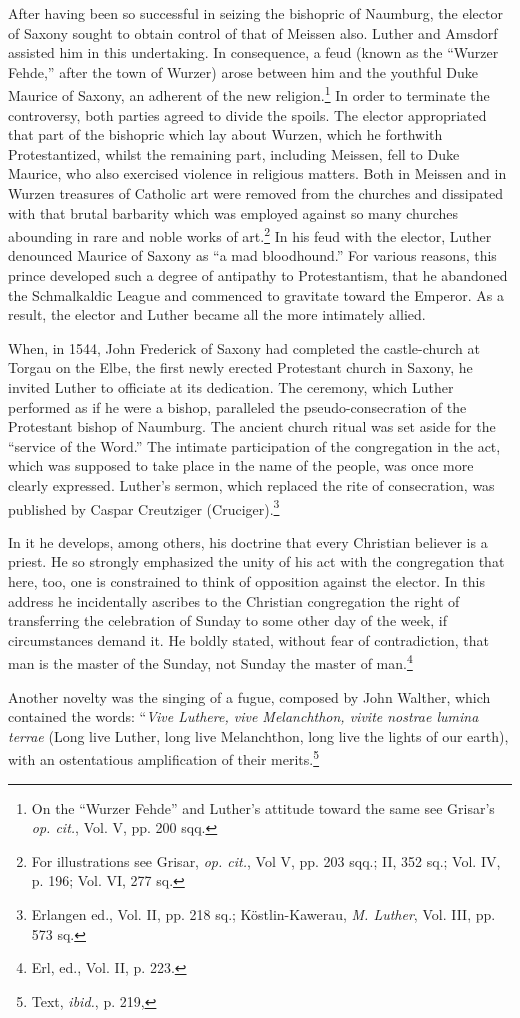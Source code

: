 After having been so successful in seizing the bishopric of Naumburg,
the elector of Saxony sought to obtain control of that of
Meissen also. Luther and Amsdorf assisted him in this undertaking.
In consequence, a feud (known as the “Wurzer Fehde,” after the
town of Wurzer) arose between him and the youthful Duke Maurice
of Saxony, an adherent of the new religion.\footnote
{On the “Wurzer Fehde” and Luther’s attitude toward the same see Grisar’s \textit{op. cit.},
Vol. V, pp. 200 sqq.}
In order to terminate
the controversy, both parties agreed to divide the spoils. The elector
appropriated that part of the bishopric which lay about Wurzen,
which he forthwith Protestantized, whilst the remaining part, including
Meissen, fell to Duke Maurice, who also exercised violence in religious
matters. Both in Meissen and in Wurzen treasures of Catholic
art were removed from the churches and dissipated with that brutal
barbarity which was employed against so many churches abounding
in rare and noble works of art.\footnote
{For illustrations see Grisar, \textit{op. cit.}, Vol V, pp. 203 sqq.; II, 352 sq.; Vol. IV, p.
196; Vol. VI, 277 sq.}
In his feud with the elector, Luther
denounced Maurice of Saxony as ``a mad bloodhound.'' For various
reasons, this prince developed such a degree of antipathy to Protestantism,
that he abandoned the Schmalkaldic League and commenced
to gravitate toward the Emperor. As a result, the elector and Luther
became all the more intimately allied.

When, in 1544, John Frederick of Saxony had completed the
castle-church at Torgau on the Elbe, the first newly erected
Protestant church in Saxony, he invited Luther to officiate at its dedication.
The ceremony, which Luther performed as if he were a bishop, paralleled
the pseudo-consecration of the Protestant bishop of Naumburg.
The ancient church ritual was set aside for the “service of the Word.”
The intimate participation of the congregation in the act, which
was supposed to take place in the name of the people, was once
more clearly expressed. Luther’s sermon, which replaced the rite of
consecration, was published by Caspar Creutziger (Cruciger).\footnote
{Erlangen ed., Vol. II, pp. 218 sq.; Köstlin-Kawerau, \textit{M. Luther}, Vol. III, pp. 573 sq.}

In it he develops, among others, his doctrine that every Christian believer
is a priest. He so strongly emphasized the unity of his act with
the congregation that here, too, one is constrained to think of opposition
against the elector. In this address he incidentally ascribes
to the Christian congregation the right of transferring the celebration
of Sunday to some other day of the week, if circumstances
demand it. He boldly stated, without fear of contradiction, that
man is the master of the Sunday, not Sunday the master of man.\footnote{Erl, ed., Vol. II, p. 223.}

Another novelty was the singing of a fugue, composed by John Walther,
which contained the words: “\textit{Vive Luthere, vive Melanchthon, vivite
nostrae lumina terrae} (Long live Luther, long live Melanchthon, long
live the lights of our earth), with an ostentatious amplification of
their merits.\footnote{Text, \textit{ibid.}, p. 219,}
